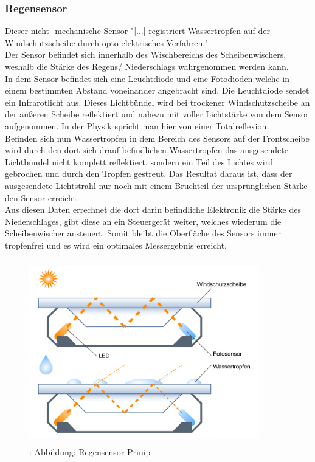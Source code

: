 			\subsubsection{Regensensor}
				Dieser nicht- mechanische Sensor "[...] registriert Wassertropfen auf der Windschutzscheibe durch opto-elektrisches Verfahren." \cite{TS15}\\
				Der Sensor befindet sich innerhalb des Wischbereichs des Scheibenwischers, weshalb die Stärke des Regens/ Niederschlags wahrgenommen werden kann.\\
				In dem Sensor befindet sich eine Leuchtdiode und eine Fotodioden welche in einem bestimmten Abstand voneinander angebracht sind. Die Leuchtdiode sendet ein Infrarotlicht aus. Dieses Lichtbündel wird bei trockener Windschutzscheibe an der äußeren Scheibe reflektiert und nahezu mit voller Lichtstärke von dem Sensor aufgenommen. In der Physik spricht man hier von einer Totalreflexion.\\
				Befinden sich nun Wassertropfen in dem Bereich des Sensors auf der Frontscheibe wird durch den dort sich drauf befindlichen Wassertropfen das ausgesendete Lichtbündel nicht komplett reflektiert, sondern ein Teil des Lichtes wird gebrochen und durch den Tropfen gestreut. Das Resultat daraus ist, dass der ausgesendete Lichtstrahl nur noch mit einem Bruchteil der ursprünglichen Stärke den Sensor erreicht.\\
				Aus diesen Daten errechnet die dort darin befindliche Elektronik die Stärke des Niederschlages, gibt diese an ein Steuergerät weiter, welches wiederum die Scheibenwischer ansteuert. Somit bleibt die Oberfläche des Sensors immer tropfenfrei und es wird ein optimales Messergebnis erreicht.
				
				\begin{figure}
					\centering
					\includegraphics[width=10cm, height=8cm] {regensensor.png}
					\caption {\cite{TS16}: Abbildung: Regensensor Prinip}
				\end{figure}	
			
